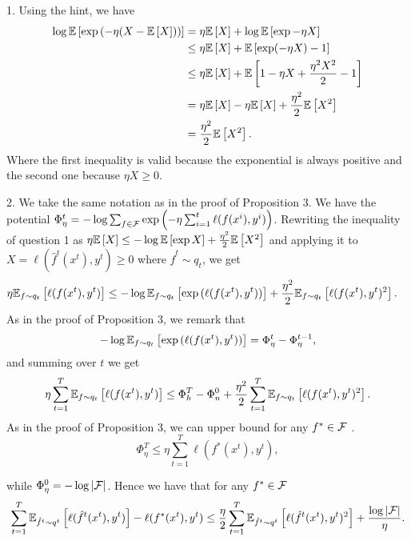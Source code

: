 \begin{solution}[]
1. Using the hint, we have
\begin{align*}
	\log \EE{\exp{(-\eta (X - \EE{X}))}} &= \eta \EE{X} + \log \EE{\exp{-\eta X}}\\
					     &\leq \eta \EE{X}+ \EE{\exp(-\eta X ) -1}	\\
					     &\leq \eta \EE{X} + \EE{1 -\eta X + \frac{\eta^2 X^2}{2}-1}\\
					     &= \eta \EE{X} - \eta \EE{X} + \frac{\eta^2}{2}\EE{X^2}\\
					     &= \frac{\eta^2}{2} \EE{X^2}.
\end{align*}
Where the first inequality is valid because the exponential is always positive and the second one because $ \eta X \geq
0$.

2. We take the same notation as in the proof of Proposition 3. We have the potential
$ \Phi_\eta^t = -\log \sum_{f \in \F}\exp{\left( -\eta \sum_{i=1}^{t}\ell(f(x^{i}),y^i) \right)} $.
Rewriting the inequality of question 1 as $ \eta \EE{X} \leq -\log \EE{\exp{X}} + \frac{\eta^2}{2}\EE{X^2} $ and
applying it to $ X = \ell(\hat{f}^{t}(x^t),y^t) \geq  0 $ where $ \hat{f}^t \sim q_t $, we get
\begin{align*}
	\eta \EEs{\ell(f(x^t),y^t)}{f\sim q_t} &\leq -\log \EEs{\exp{(\ell(f(x^t),y^t))}}{f\sim q_t} +
	\frac{\eta^2}{2}\EEs{\ell(f(x^t),y^t)^2}{f\sim q_t}.
\end{align*}
As in the proof of Proposition 3, we remark that
\begin{equation*}
	-\log\EEs{\exp{(\ell(f(x^t),y^t))}}{f\sim q_t} = \Phi_{\eta}^t - \Phi_{\eta}^{t-1},
\end{equation*}
and summing over $t$ we get
\begin{equation*}
	\eta \sum_{t=1}^{T}\EEs{\ell(f(x^t),y^t)}{f \sim q_t} \leq \Phi_{h}^{T} - \Phi_{n}^{0} +
	\frac{\eta^2}{2}\sum_{t=1}^{T}\EEs{\ell(f(x^t),y^t)^2}{f\sim q_t}.
\end{equation*}
As in the proof of Proposition 3, we can upper bound for any $ f^{*}\in \F $ .
\begin{equation*}
	\Phi_{\eta}^T \leq \eta \sum_{t=1}^{T}\ell(f^{*}(x^t),y^t),
\end{equation*}

while $ \Phi_{\eta}^0 = - \log |\F|$. Hence we have that for any $ f^{*}\in \F $
\begin{equation*}
	\sum_{t=1}^{T}\EEs{\ell(\hat{f}^{t}(x^t),y^t)}{\hat{f}^{t}\sim q^{t}} - \ell(f^{*}(x^t),y^t) \leq
	\frac{\eta}{2}\sum_{t=1}^{T}\EEs{\ell(\hat{f}^{t}(x^t),y^t)^2}{\hat{f}^{t}\sim q^{t}} + \frac{\log |\F|}{\eta}.
\end{equation*}


\end{solution}
